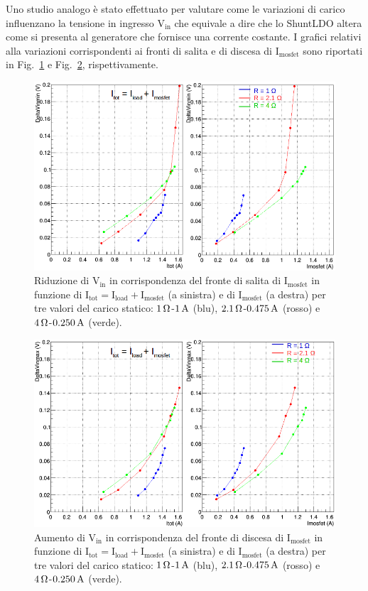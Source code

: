 Uno studio analogo \`e stato effettuato per valutare come le variazioni di carico influenzano la tensione in ingresso $\mathrm{V_{in}}$ che equivale a dire che lo ShuntLDO altera come si presenta al generatore che fornisce una corrente costante. I grafici relativi alla variazioni corrispondenti ai fronti di salita e di discesa di $\mathrm{I_{mosfet}}$ sono riportati in Fig.~\ref{VinUnd} e Fig.~\ref{VinOver}, rispettivamente. 
\begin{figure}
\centering
\includegraphics[width=0.9\linewidth]{Immagini/VinUnd}
\caption{Riduzione di $\mathrm{V_{in}}$ in corrispondenza del fronte di salita di $\mathrm{I_{mosfet}}$ in funzione di $\mathrm{I_{tot} = I_{load}+I_{mosfet}}$ (a sinistra) e di $\mathrm{I_{mosfet}}$ (a destra) per tre valori del carico statico: $1{\rm \, \Omega}$-$1\rm \, A$ (blu), $2.1{\rm \, \Omega}$-$0.475\rm \, A$ (rosso) e $4{\rm \, \Omega}$-$0.250\rm \, A$ (verde). }
\label{VinUnd}
\end{figure}
\begin{figure}
\centering
\includegraphics[width=0.9\linewidth]{Immagini/VinOver}
\caption{Aumento di $\mathrm{V_{in}}$ in corrispondenza del fronte di discesa di $\mathrm{I_{mosfet}}$ in funzione di $\mathrm{I_{tot} = I_{load}+I_{mosfet}}$ (a sinistra) e di $\mathrm{I_{mosfet}}$ (a destra) per tre valori del carico statico: $1{\rm \, \Omega}$-$1\rm \, A$ (blu), $2.1{\rm \, \Omega}$-$0.475\rm \, A$ (rosso) e $4{\rm \, \Omega}$-$0.250\rm \, A$ (verde).}
\label{VinOver}
\end{figure}
